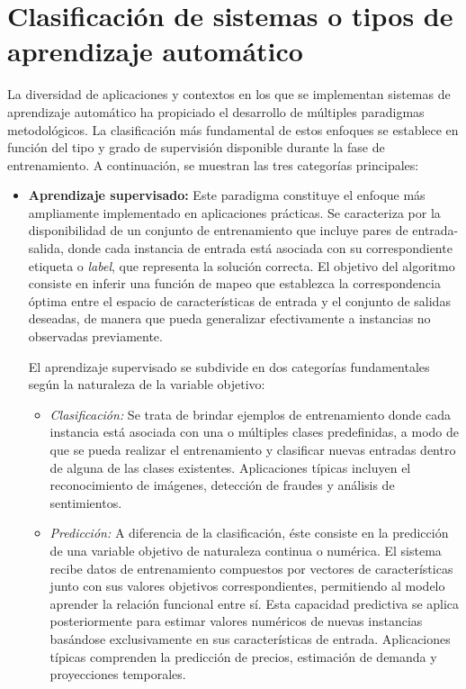 \section{Clasificación de sistemas o tipos de aprendizaje automático}
%

La diversidad de aplicaciones y contextos en los que se implementan sistemas de aprendizaje automático ha propiciado el desarrollo de múltiples paradigmas metodológicos. La clasificación más fundamental de estos enfoques se establece en función del tipo y grado de supervisión disponible durante la fase de entrenamiento. A continuación, se muestran las tres categorías principales:
%

\begin{itemize}
    \item \textbf{Aprendizaje supervisado:} Este paradigma constituye el enfoque más ampliamente implementado en aplicaciones prácticas. Se caracteriza por la disponibilidad de un conjunto de entrenamiento que incluye pares de entrada-salida, donde cada instancia de entrada está asociada con su correspondiente etiqueta o \textit{label}, que representa la solución correcta. El objetivo del algoritmo consiste en inferir una función de mapeo que establezca la correspondencia óptima entre el espacio de características de entrada y el conjunto de salidas deseadas, de manera que pueda generalizar efectivamente a instancias no observadas previamente.
    
    El aprendizaje supervisado se subdivide en dos categorías fundamentales según la naturaleza de la variable objetivo:

    \begin{itemize}
        \item \textit{Clasificación:} Se trata de brindar ejemplos de entrenamiento donde cada instancia está asociada con una o múltiples clases predefinidas, a modo de que se pueda realizar el entrenamiento y clasificar nuevas entradas dentro de alguna de las clases existentes. Aplicaciones típicas incluyen el reconocimiento de imágenes, detección de fraudes y análisis de sentimientos.
        
        \item \textit{Predicción:} A diferencia de la clasificación, éste consiste en la predicción de una variable objetivo de naturaleza continua o numérica. El sistema recibe datos de entrenamiento compuestos por vectores de características junto con sus valores objetivos correspondientes, permitiendo al modelo aprender la relación funcional entre sí. Esta capacidad predictiva se aplica posteriormente para estimar valores numéricos de nuevas instancias basándose exclusivamente en sus características de entrada. Aplicaciones típicas comprenden la predicción de precios, estimación de demanda y proyecciones temporales.
    \end{itemize}
    

\end{itemize}
